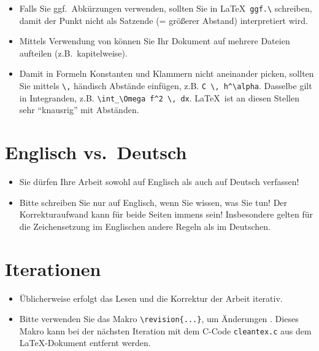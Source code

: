 {\begin{itemize}
\item Falls Sie ggf.\ Abkürzungen verwenden, sollten Sie in \LaTeX\ \verb$ggf.\$ schreiben, damit der Punkt nicht als Satzende (= größerer Abstand) interpretiert wird.

\item Mittels Verwendung von \verb$$ können Sie Ihr Dokument auf mehrere Dateien aufteilen (z.B.\ kapitelweise).

\item Damit in Formeln Konstanten und Klammern nicht aneinander picken, sollten Sie mittels \verb$\,$ händisch Abstände einfügen, z.B. \verb$C \, h^\alpha$. Dasselbe gilt in Integranden, z.B. \verb$\int_\Omega f^2 \, dx$. \LaTeX\ ist an diesen Stellen sehr "`knausrig"' mit Abständen.
\end{itemize}
}

\section{Englisch vs.\ Deutsch}

{\color{change}
\begin{itemize}

\item Sie dürfen Ihre Arbeit sowohl auf Englisch als auch auf Deutsch verfassen!

\item Bitte schreiben Sie nur auf Englisch, wenn Sie wissen, was Sie tun! Der Korrekturaufwand kann für beide Seiten immens sein! Insbesondere gelten für die Zeichensetzung im Englischen andere Regeln als im Deutschen.

\end{itemize}
}

\section{Iterationen}

{\color{change}
\begin{itemize}

\item Üblicherweise erfolgt das Lesen und die Korrektur der Arbeit iterativ.
\item Bitte verwenden Sie das Makro \verb$\revision{...}$, um Änderungen . Dieses Makro kann bei der nächsten Iteration mit dem C-Code \verb$cleantex.c$ aus dem \LaTeX-Dokument entfernt werden.

\end{itemize}
}